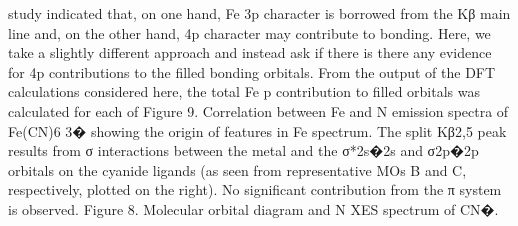 study indicated that, on one hand, Fe 3p character is borrowed
from the Kβ main line and, on the other hand, 4p character may
contribute to bonding. Here, we take a slightly diﬀerent approach
and instead ask if there is there any evidence for 4p contributions
to the ﬁlled bonding orbitals.
From the output of the DFT calculations considered here, the
total Fe p contribution to ﬁlled orbitals was calculated for each of
Figure 9. Correlation between Fe and N emission spectra of Fe(CN)6
3� showing the origin of features in Fe spectrum. The split Kβ2,5 peak results from
σ interactions between the metal and the σ*2s�2s and σ2p�2p orbitals on the cyanide ligands (as seen from representative MOs B and C, respectively,
plotted on the right). No signiﬁcant contribution from the π system is observed.
Figure 8. Molecular orbital diagram and N XES spectrum of CN�.


